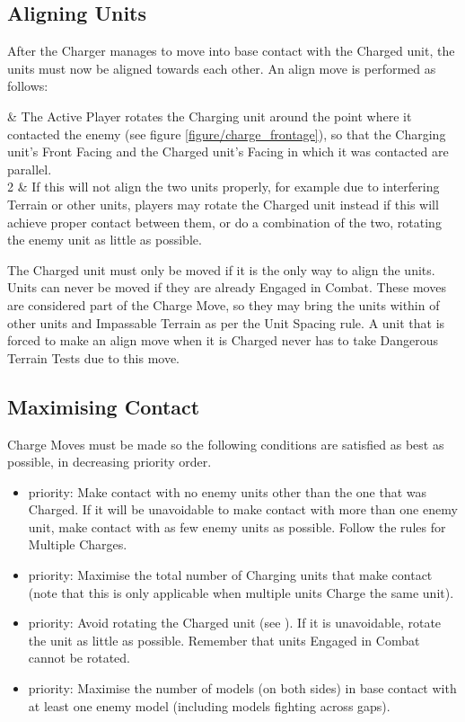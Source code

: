 \subsection{Aligning Units}
\label{aligning_units}

After the Charger manages to move into base contact with the Charged unit, the units must now be aligned towards each other. An align move is performed as follows:

 & The Active Player rotates the Charging unit around the point where it contacted the enemy (see figure \ref{figure/charge_frontage}), so that the Charging unit's Front Facing and the Charged unit's Facing in which it was contacted are parallel.\\
2 & If this will not align the two units properly, for example due to interfering Terrain or other units, players may rotate the Charged unit instead if this will achieve proper contact between them, or do a combination of the two, rotating the enemy unit as little as possible.\\
\closeseqtable

The Charged unit must only be moved if it is the only way to align the units. Units can never be moved if they are already Engaged in Combat. These moves are considered part of the Charge Move, so they may bring the units within  of other units and Impassable Terrain as per the Unit Spacing rule. A unit that is forced to make an align move when it is Charged never has to take Dangerous Terrain Tests due to this move.

\subsection{Maximising Contact}
\label{maximising_contact}

Charge Moves must be made so the following conditions are satisfied as best as possible, in decreasing priority order.

\begin{itemize}
\item {} priority: Make contact with no enemy units other than the one that was Charged. If it will be unavoidable to make contact with more than one enemy unit, make contact with as few enemy units as possible. Follow the rules for Multiple Charges.
\item {} priority: Maximise the total number of Charging units that make contact (note that this is only applicable when multiple units Charge the same unit).
\item {} priority: Avoid rotating the Charged unit (see ). If it is unavoidable, rotate the unit as little as possible. Remember that units Engaged in Combat cannot be rotated.
\item {} priority: Maximise the number of models (on both sides) in base contact with at least one enemy model (including models fighting across gaps).
\end{itemize}

